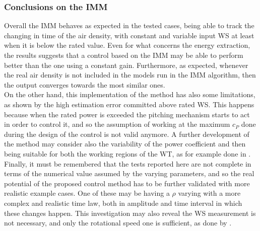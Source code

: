 \subsubsection{Conclusions on the IMM}
Overall the IMM behaves as expected in the tested cases, being able to track the changing in time of the air density, with constant and variable input WS at least when it is below the rated value. Even for what concerns the energy extraction, the results suggests that a control based on the IMM may be able to perform better than the one using a constant gain. Furthermore, as expected, whenever the real air density is not included in the models run in the IMM algorithm, then the output converges towards the most similar ones.\\
On the other hand, this implementation of the method has also some limitations, as shown by the high estimation error committed above rated WS. This happens because when the rated power is exceeded the pitching mechanism starts to act in order to control it, and so the assumption of working at the maximum $c_P$ done during the design of the control is not valid anymore. A further development of the method may consider also the variability of the power coefficient and then being suitable for both the working regions of the WT, as for example done in \cite{kalman_based_IMM}.\\
Finally, it must be remembered that the tests reported here are not complete in terms of the numerical value assumed by the varying parameters, and so the real potential of the proposed control method has to be further validated with more realistic example cases. One of these may be having a $\rho$ varying with a more complex and realistic time law, both in amplitude and time interval in which these changes happen. This investigation may also reveal the WS measurement is not necessary, and only the rotational speed one is sufficient, as done by \cite{kalman_based_IMM}.

\newpage